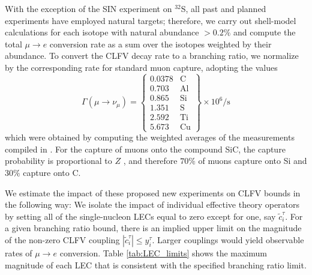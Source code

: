 \documentclass{book}[letterpaper,12pt]
\begin{document}
With the exception of the SIN experiment on $^{32}$S, all past and planned experiments have employed natural targets; therefore, we carry out shell-model calculations for each isotope with natural abundance $>0.2\%$ and compute the total $\mu\rightarrow e$ conversion rate as a sum over the isotopes weighted by their abundance. To convert the CLFV decay rate to a branching ratio, we normalize by the corresponding rate for standard muon capture, adopting the values
\begin{equation}
\Gamma\left(\mu\rightarrow\nu_{\mu}\right)=\left\{\begin{array}{lr}
0.0378 & \mathrm{C}\\
0.703 & \mathrm{Al}\\
0.865 & \mathrm{Si}\\
1.351 & \mathrm{S}\\
2.592 & \mathrm{Ti}\\
5.673 & \mathrm{Cu}
\end{array}\right\}\times 10^6\mathrm{/s}
\end{equation}
which were obtained by computing the weighted averages of the measurements compiled in \cite{PhysRevC.35.2212}. For the capture of muons onto the compound SiC, the capture probability is proportional to $Z$ \cite{PhysRev.72.399}, and therefore $70\%$ of muons capture onto Si and $30\%$ capture onto C.

We estimate the impact of these proposed new experiments on CLFV bounds in the following way: We isolate the impact of individual effective theory operators by setting all of the single-nucleon LECs equal to zero except for one, say $\tilde{c}_i^{\tau}$. For a given branching ratio bound, there is an implied upper limit on the magnitude of the non-zero CLFV coupling $|\tilde{c}_i^{\tau}|\leq y_i^{\tau}$. Larger couplings would yield observable rates of $\mu\rightarrow e$ conversion. Table \ref{tab:LEC_limits} shows the maximum magnitude of each LEC that is consistent with the specified branching ratio limit. 
\end{document}
